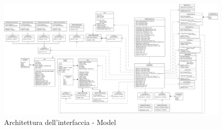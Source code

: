 \begin{landscape}
	\begin{figure}[h!]
		\includegraphics[width=24cm]{img/ui messaggi.png}
		\caption{Architettura dell'interfaccia - Model}
	\end{figure}
\end{landscape}